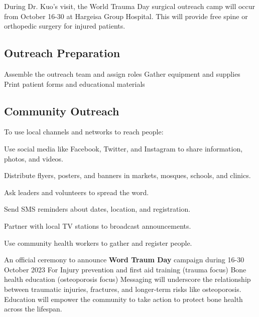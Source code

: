\documentclass{article}
\begin{document}
During Dr. Kuo's visit, the World Trauma Day surgical outreach camp will occur from October 16-30 at Hargeisa Group Hospital. 
This will provide free spine or orthopedic surgery for injured patients.



\subsection{Outreach Preparation}

\begin{outline}
    \1 Assemble the outreach team and assign roles
    \1 Gather equipment and supplies
    \1 Print patient forms and educational materials

\end{outline}

\subsection{Community Outreach}


\begin{outline}
To use local channels and networks to reach people:

\1 Use social media like Facebook, Twitter, and Instagram to share information, photos, and videos.

\1 Distribute flyers, posters, and banners in markets, mosques, schools, and clinics.

\1 Ask leaders and volunteers to spread the word.

\1 Send SMS reminders about dates, location, and registration.

\1 Partner with local TV stations to broadcast announcements.

\1 Use community health workers to gather and register people.

\1 An official ceremony to announce \textbf{Word Traum Day} campaign during 16-30 October 2023
    \2 For Injury prevention and first aid training (trauma focus)
    \2 Bone health education (osteoporosis focus)
    \2 Messaging will underscore the relationship between traumatic injuries, fractures, and longer-term risks like osteoporosis. Education will empower the community to take action to protect bone health across the lifespan.
\end{outline}
\end{document}
